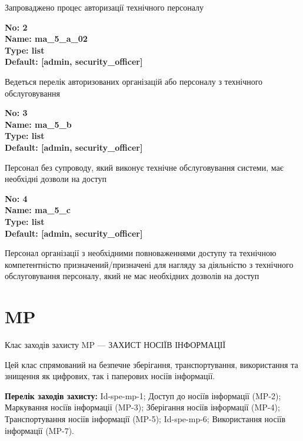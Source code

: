\documentclass{article}
\begin{document}
{\footnotesize Запроваджено процес авторизації технічного персоналу}


{\footnotesize\bfseries
No: 2\\
Name: ma\_\allowbreak{}5\_\allowbreak{}a\_\allowbreak{}02\\
Type: list\\
Default: [\textquotedbl{}admin\textquotedbl{}, \textquotedbl{}security\_\allowbreak{}officer\textquotedbl{}]
}

{\footnotesize Ведеться перелік авторизованих організацій або персоналу з технічного обслуговування}


{\footnotesize\bfseries
No: 3\\
Name: ma\_\allowbreak{}5\_\allowbreak{}b\\
Type: list\\
Default: [\textquotedbl{}admin\textquotedbl{}, \textquotedbl{}security\_\allowbreak{}officer\textquotedbl{}]
}

{\footnotesize Персонал без супроводу, який виконує технічне обслуговування системи, має необхідні дозволи на доступ}


{\footnotesize\bfseries
No: 4\\
Name: ma\_\allowbreak{}5\_\allowbreak{}c\\
Type: list\\
Default: [\textquotedbl{}admin\textquotedbl{}, \textquotedbl{}security\_\allowbreak{}officer\textquotedbl{}]
}

{\footnotesize Персонал організації з необхідними повноваженнями доступу та технічною компетентністю призначений/призначені для нагляду за діяльністю з технічного обслуговування персоналу, який не має необхідних дозволів на доступ}




\section{MP}
Клас заходів захисту MP --- ЗАХИСТ НОСІЇВ ІНФОРМАЦІЇ

Цей клас спрямований на безпечне зберігання, транспортування, використання та знищення як цифрових, так і паперових носіїв інформації.

\textbf{Перелік заходів захисту:} Id-spe-mp-1; Доступ до носіїв інформації (MP-2); Маркування носіїв інформації (MP-3); Зберігання носіїв інформації (MP-4); Транспортування носіїв інформації (MP-5); Id-spe-mp-6; Використання носіїв інформації (MP-7).
\end{document}
